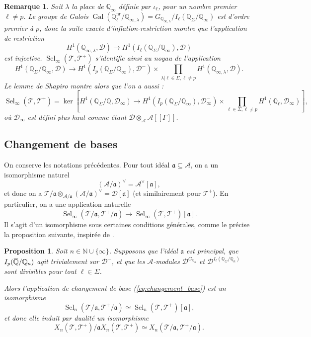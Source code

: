 \documentclass[12pt]{amsart}
\newcommand\bN{\mathbb{N}}
\newcommand\bQ{\mathbb{Q}}
\newcommand\cA{\mathcal{A}}
\newcommand\cD{\mathcal{D}}
\newcommand\cT{\mathcal{T}}
\newcommand\ga{\mathfrak{a}}
\newcommand{\ob}[1]{\mkern 1.5mu\overline{\mkern-1.5mu#1\mkern-1.5mu}\mkern 1.5mu}
\DeclareMathOperator{\Gal}{Gal}
\DeclareMathOperator{\Sel}{Sel}
\theoremstyle{defstyle}
\newtheorem{remarque}[subsubsection]{Remarque}
\theoremstyle{thmstyle}
\newtheorem{proposition}[subsubsection]{Proposition}
\begin{document}
\begin{remarque}\label{inertie_décomp}
	Soit $\lambda$ la place de $\bQ_\infty$ définie par $\iota_\ell$, pour un nombre premier $\ell\neq p$. Le groupe de Galois $\Gal(\bQ_\ell^\textrm{nr}/\bQ_{\infty,\lambda})=G_{\bQ_{\infty,\lambda}}/I_\ell(\bQ_\Sigma/\bQ_\infty)$ est d'ordre premier à $p$, donc la suite exacte d'inflation-restriction montre que l'application de restriction 
	$$H^1(\bQ_{\infty,\lambda},\cD) \longrightarrow H^1(I_\ell(\bQ_\Sigma/\bQ_\infty),\cD)$$
	est injective. $\Sel_\infty(\cT,\cT^+)$ s'identifie ainsi au noyau de l'application 
	$$
	H^1(\bQ_{\Sigma}/\bQ_\infty,\cD) \longrightarrow H^1(I_{p}(\bQ_{\Sigma}/\bQ_\infty),\cD^-) \times \prod_{\lambda |\ell \in \Sigma,\ell\neq p} H^1(\bQ_{\infty,\lambda},\cD).
	$$
	Le lemme de Shapiro montre alors que l'on a aussi :
	$$\Sel_\infty(\cT,\cT^+)=\ker \left[ H^1(\bQ_\Sigma/\bQ,\cD_\infty) \longrightarrow H^1(I_{p}(\bQ_\Sigma/\bQ_\infty),\cD_\infty^-) \times \prod_{\ell \in \Sigma, \ell\neq p} H^1(\bQ_\ell,\cD_\infty)  \right],$$
	où $\cD_\infty$ est défini plus haut comme étant $\cD \otimes_\cA \cA[[\Gamma]]$. 
\end{remarque}

\subsection{Changement de bases}
On conserve les notations précédentes. Pour tout idéal $\ga \subseteq \cA$, on a un isomorphisme naturel 
$$ (\cA/\ga)^\vee = \cA^\vee[\ga],$$
et donc on a $\cT/\ga \otimes_{\cA/\ga} (\cA/\ga)^\vee =\cD[\ga]$ (et similairement pour $\cT^+$). En particulier, on a une application naturelle 
\begin{equation}\label{eq:changement_base}
\Sel_\infty(\cT/\ga,\cT^+/\ga) \longrightarrow \Sel_\infty(\cT,\cT^+)[\ga].
\end{equation}
Il s'agit d'un isomorphisme sous certaines conditions générales, comme le précise la proposition suivante, inspirée de \cite[Proposition 3.7]{skinner2014iwasawa}.

\begin{proposition}\label{changement_base}
	Soit $n\in\bN\cup\{\infty\}$. Supposons que l'idéal $\ga$ est principal, que $I_p(\ob{\bQ}/\bQ_n)$ agit trivialement sur $\cD^-$, et que les $\cA$-modules $\cD^{G_{\bQ_n}}$ et $\cD^{I_\ell(\bQ_\Sigma/\bQ_n)}$ sont divisibles pour tout $\ell \in \Sigma$.
	
	Alors l'application de changement de base (\ref{eq:changement_base}) est un isomorphisme 
	$$\Sel_n(\cT/\ga,\cT^+/\ga) \simeq \Sel_n(\cT,\cT^+)[\ga],$$ 
	et donc elle induit par dualité un isomorphisme 
	$$X_n(\cT,\cT^+)/\ga X_n(\cT,\cT^+) \simeq X_n(\cT/\ga,\cT^+/\ga).$$
\end{proposition}
\end{document}
